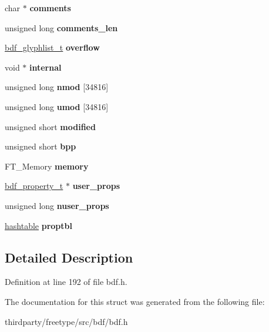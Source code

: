 \begin{DoxyCompactItemize}
char $\ast$ {\bfseries comments}
\item 
\mbox{\label{structbdf__font__t___aa19a7ff59b980de1dde381f58604776b}} 
unsigned long {\bfseries comments\+\_\+len}
\item 
\mbox{\label{structbdf__font__t___a4431c55ce3c6e10aeaa1cc98a8b83da6}} 
\hyperlink{structbdf__glyphlist__t__}{bdf\+\_\+glyphlist\+\_\+t} {\bfseries overflow}
\item 
\mbox{\label{structbdf__font__t___a24c05f97dc9c91f48345819076149c8d}} 
void $\ast$ {\bfseries internal}
\item 
\mbox{\label{structbdf__font__t___a085fe9dff646a8ebe4a14af896beb763}} 
unsigned long {\bfseries nmod} \mbox{[}34816\mbox{]}
\item 
\mbox{\label{structbdf__font__t___abf9b6aaf74eff6b13f0e69f91b35e6b5}} 
unsigned long {\bfseries umod} \mbox{[}34816\mbox{]}
\item 
\mbox{\label{structbdf__font__t___a8466846de62a242cb6dab486340a38ba}} 
unsigned short {\bfseries modified}
\item 
\mbox{\label{structbdf__font__t___a8530eb34ba97eddfde7debeb434c6398}} 
unsigned short {\bfseries bpp}
\item 
\mbox{\label{structbdf__font__t___a897bd6bf78b5d2105f01225b587de0e5}} 
F\+T\+\_\+\+Memory {\bfseries memory}
\item 
\mbox{\label{structbdf__font__t___aff96795d8125297f162adf20f402fac8}} 
\hyperlink{structbdf__property__t__}{bdf\+\_\+property\+\_\+t} $\ast$ {\bfseries user\+\_\+props}
\item 
\mbox{\label{structbdf__font__t___a4c36cc0c004f96e8f8006d4f66e24650}} 
unsigned long {\bfseries nuser\+\_\+props}
\item 
\mbox{\label{structbdf__font__t___a0c83e60025afe18eece5832cf8a38a0f}} 
\hyperlink{structhashtable__}{hashtable} {\bfseries proptbl}
\end{DoxyCompactItemize}


\subsection{Detailed Description}


Definition at line 192 of file bdf.\+h.



The documentation for this struct was generated from the following file\+:\begin{DoxyCompactItemize}
\item 
thirdparty/freetype/src/bdf/bdf.\+h\end{DoxyCompactItemize}
